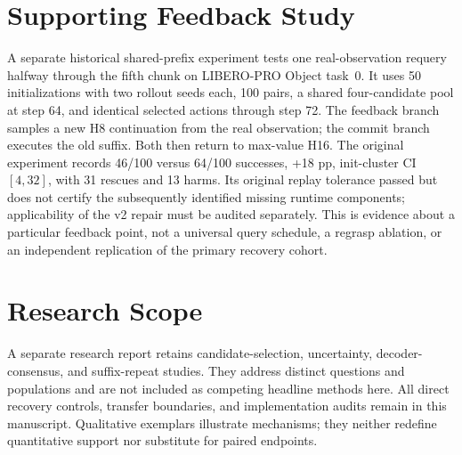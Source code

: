 \documentclass{article}
\begin{document}
\section{Supporting Feedback Study}
\label{app:feedback}
A separate historical shared-prefix experiment tests one real-observation
requery halfway through the fifth chunk on LIBERO-PRO Object task~0.
It uses 50 initializations with two rollout seeds each, 100 pairs, a shared
four-candidate pool at step 64, and identical selected actions through step 72.
The feedback branch samples a new H8 continuation from the real observation;
the commit branch executes the old suffix. Both then return to max-value H16.
The original experiment records 46/100 versus 64/100 successes, +18 pp,
init-cluster CI $[4,32]$, with 31 rescues and 13 harms.
Its original replay tolerance passed but does not certify the subsequently
identified missing runtime components; applicability of the v2 repair must
be audited separately. This is evidence about a particular feedback point,
not a universal query schedule, a regrasp ablation, or an independent
replication of the primary recovery cohort.

\section{Research Scope}
A separate research report retains candidate-selection, uncertainty,
decoder-consensus, and suffix-repeat studies. They address distinct questions
and populations and are not included as competing headline methods here.
All direct recovery controls, transfer boundaries, and implementation audits
remain in this manuscript. Qualitative exemplars illustrate mechanisms;
they neither redefine quantitative support nor substitute for paired endpoints.
\end{document}
